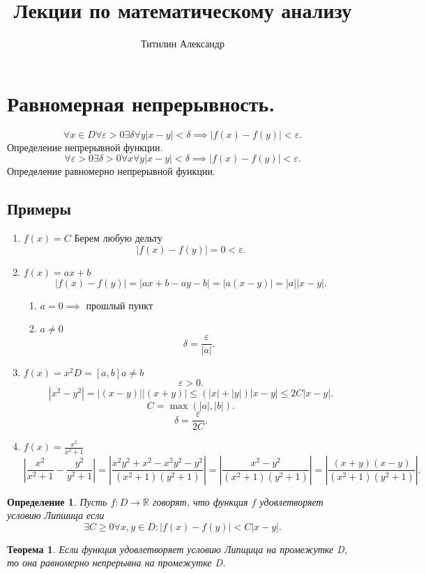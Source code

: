 \documentclass{scrartcl}
\title{Лекции по математическому анализу}
\author{Титилин Александр}
\date{}
\newtheorem{theorem}{Теорема}
\newtheorem{definition}{Определение}
\begin{document}
\maketitle
\section{Равномерная непрерывность.}
\[
	\forall x \in D \forall  \varepsilon > 0 \exists  \delta \forall y |x - y| < \delta\implies |f(x) -f(y)| < \varepsilon
	.\]
Определение непрерывной функции.
\[
	\forall  \varepsilon > 0 \exists  \delta >0 \forall x \forall y |x- y| < \delta \implies |f(x) - f(y)| < \varepsilon
	.\]
Определение равномерно непрерывной функции.
\subsection{Примеры}
\begin{enumerate}
	\item $f(x) =  C$
	      Берем любую дельту
	      \[
		      |f(x) - f(y)| = 0 < \varepsilon
		      .\]
	\item $f(x) = ax + b$
	      \[
		      |f(x) - f(y)| = |ax + b - ay -b| =|a(x - y)| = |a||x - y|
		      .\]
	      \begin{enumerate}
		      \item $a = 0 \implies$ прошлый пункт
		      \item $a \neq 0$
		            \[
			            \delta = \frac{\varepsilon}{|a|}
			            .\]
	      \end{enumerate}
	\item $f(x) =  x^2 D = [a,b] a\neq b$
	      \[
		      \varepsilon > 0
		      .\]
	      \[
		      |x^2 - y^2| = |(x - y)||(x + y)| \le  (|x| + |y|)|x - y| \le  2C|x - y|
		      .\]
	      \[
		      C = \max(|a| , |b|)
		      .\]
	      \[
		      \delta = \frac{\varepsilon}{2C}
		      .\]
	\item $f(x) = \frac{x^2}{x^2 + 1}$
	      \[
		      | \frac{x^2}{x^2 + 1} - \frac{y^2}{y^2 + 1} | =
		      |\frac{x^2y^2 + x^2 - x^2y^2 - y^2}{(x^2 + 1)(y^2 + 1)}| =
		      |\frac{x^2 - y^2}{(x^2 + 1)(y^2 + 1)}| =
		      |\frac{(x + y)(x - y)}{(x^2 + 1)(y^2 + 1)}|
		      .\]
\end{enumerate}
\begin{definition}
	Пусть $f: D \to \mathbb{R}$ говорят, что функция $f$ удовлетворяет условию Липшица
	если
	\[
		\exists  C \ge  0 \forall  x, y \in D : |f(x) - f(y)| < C|x - y|
		.\]
\end{definition}
\begin{theorem}
	Если функция удовлетворяет условию Липщица на промежутке D, то она равномерно
	непрерывна на промежутке D.
\end{theorem}
\end{document}

